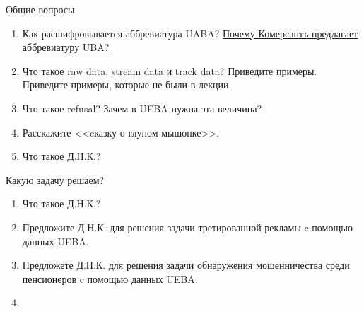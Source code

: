 \begin{frame}{Общие вопросы}
	\begin{enumerate}
		\item Как расшифровывается аббревиатура UABA? 
		\href{https://finance.rambler.ru/business/36508148-13-aprelya-v-moskve-id-kommersant-provedet-biznes-branch-user-behavior-analytics-uba-modnyy-trend-ili-novoe-effektivnoe-reshenie/}{Почему Комерсантъ предлагает аббревиатуру UBA?}
		\item Что такое raw data, stream data и track data? Приведите примеры. Приведите примеры, которые не были в лекции.
		\item Что такое refusal? Зачем в UEBA нужна эта величина?
		\item Расскажите <<cказку о глупом мышонке>>.
		\item Что такое Д.Н.К.?
	\end{enumerate}
\end{frame}

\begin{frame}{Какую задачу решаем?}
		\begin{enumerate}
		\item Что такое Д.Н.К.?
		\item Предложите Д.Н.К. для решения задачи третированной рекламы c помощью данных UEBA.
		\item Предложете Д.Н.К. для решения задачи обнаружения мошенничества среди пенсионеров c помощью данных UEBA.
		\item 
	\end{enumerate}
\end{frame}


